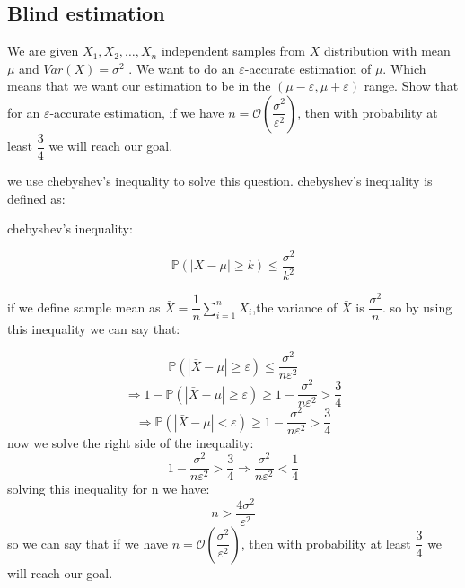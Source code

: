 \subsection{Blind estimation}
We are given $X_1, X_2, \dots , X_n$ independent samples from $X$ distribution with mean $\mu$ and $Var(X) = \sigma ^2$
. We want to do an $\varepsilon $-accurate estimation of $\mu$. Which means that we want
our estimation to be in the $(\mu - \varepsilon, \mu + \varepsilon)$ range. Show that for an $\varepsilon$-accurate estimation, if we
have $n = \mathcal{O}(\dfrac{\sigma ^2}{\varepsilon ^2})$, then with probability at least $\dfrac{3}{4}$ we will reach our goal.
\begin{qsolve}
	we use chebyshev's inequality to solve this question. chebyshev's inequality is defined as:
	\begin{qsolve}[]
		\begin{center}
			chebyshev's inequality:
		\end{center}
		$$\mathbb{P}(|X - \mu| \geq k) \leq \dfrac{\sigma^2}{k^2}$$
	\end{qsolve}
	if we define sample mean as $\bar{X} = \dfrac{1}{n} \sum_{i=1}^{n} X_i$,the variance of $\bar{X}$ is $\dfrac{\sigma^2}{n}$. so by using this inequality we can say that:
	\begin{qsolve}[]
		$$\mathbb{P}(|\bar{X} - \mu| \geq \varepsilon) \leq \dfrac{\sigma^2}{n \varepsilon^2}$$
		$$\Rightarrow1 - \mathbb{P}(|\bar{X} - \mu| \geq \varepsilon) \geq 1 - \dfrac{\sigma^2}{n \varepsilon^2} > \dfrac{3}{4}$$
		$$\Rightarrow \mathbb{P}(|\bar{X} - \mu| < \varepsilon) \geq 1 - \dfrac{\sigma^2}{n \varepsilon^2} > \dfrac{3}{4}$$
		now we solve the right side of the inequality:
		$$1 - \dfrac{\sigma^2}{n \varepsilon^2} > \dfrac{3}{4} \Rightarrow \dfrac{\sigma^2}{n \varepsilon^2} < \dfrac{1}{4}$$
		solving this inequality for n we have:
		$$n > \dfrac{4\sigma^2}{\varepsilon^2}$$
		so we can say that if we have $n = \mathcal{O}(\dfrac{\sigma ^2}{\varepsilon ^2})$, then with probability at least $\dfrac{3}{4}$ we will reach our goal.
	\end{qsolve}
\end{qsolve}